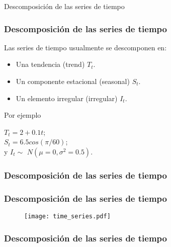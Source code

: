 \documentclass[xcolor=(list of options)]{beamer}
\begin{document}
\begin{section}{Descomposici\'on de las series de tiempo}
\begin{frame}
\frametitle{Descomposici\'on de las series de tiempo}

Las series de tiempo usualmente se descomponen en:
\begin{itemize}
\item Una tendencia (trend) $T_t$. 
\item Un componente estacional (seasonal) $S_t $.
\item Un elemento irregular (irregular) $I_t$.
\end{itemize}
\vspace{5mm}
Por ejemplo \\
\begin{center}
\vspace{5mm}
$T_t=2+0.1 t$; \\
\vspace{5mm}
$S_t = 6.5 cos (\pi/60)$; \\
\vspace{5mm}
y $I_t\sim$ $N(\mu=0, \sigma^2=0.5)$. 
\end{center}
\end{frame}
\begin{frame}
\frametitle{Descomposici\'on de las series de tiempo}

\end{frame}

\begin{frame}
\frametitle{Descomposici\'on de las series de tiempo}
\begin{figure}[t!]
\texttt{[image: time\_series.pdf]}
\end{figure}
\end{frame}
\begin{frame}
\frametitle{Descomposici\'on de las series de tiempo}


\end{frame}
\end{section}
\end{document}
